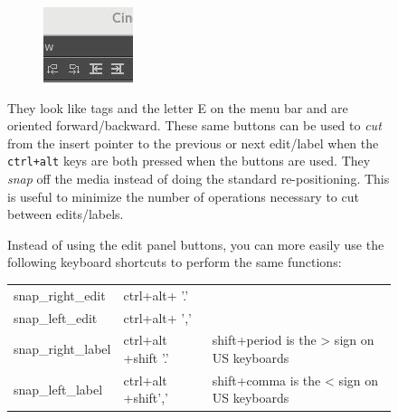\begin{figure}
\begin{figure}
    \vspace{-2ex}
    \centering
    \includegraphics[width=0.99\linewidth]{images/snap.png}
\end{figure}

They look like tags and the letter E on the menu bar and are oriented forward/backward.  These same buttons can be used to \textit{cut} from the insert pointer to the previous or next edit/label when the \texttt{ctrl+alt} keys are both pressed when the buttons are used.  They \textit{snap} off the media instead of doing the standard re-positioning.  This is useful to minimize the number of operations necessary to cut between edits/labels.

Instead of using the edit panel buttons, you can more easily use the following keyboard shortcuts to perform the same functions:
\begin{center}
    \begin{tabular}{l l l}
        \toprule
        snap\_right\_edit &	ctrl+alt+ '.' & \\
        snap\_left\_edit &	ctrl+alt+ ',' & \\
        snap\_right\_label &	ctrl+alt +shift '.' &  shift+period is the > sign on US keyboards \\
        snap\_left\_label & 	ctrl+alt +shift',' &  shift+comma is the < sign on US keyboards \\
        \bottomrule
    \end{tabular}
\end{center}


\end{figure}
